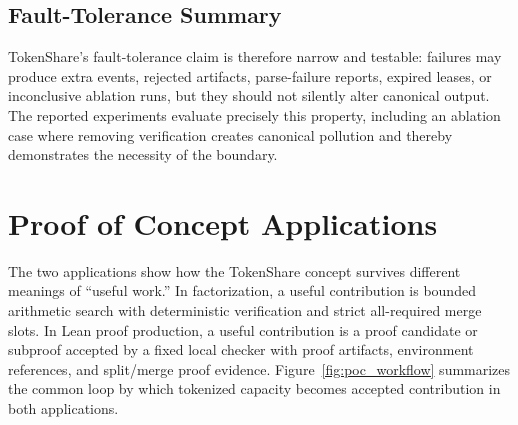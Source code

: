 \documentclass{article}
\theoremstyle{plain}
\begin{document}
\subsection{Fault-Tolerance Summary}

{\color{blue}
TokenShare's fault-tolerance claim is therefore narrow and testable: failures may produce extra events, rejected artifacts, parse-failure reports, expired leases, or inconclusive ablation runs, but they should not silently alter canonical output. The reported experiments evaluate precisely this property, including an ablation case where removing verification creates canonical pollution and thereby demonstrates the necessity of the boundary.
}
\section{Proof of Concept Applications}



{\color{blue}
The two applications show how the TokenShare concept survives different meanings of ``useful work.'' In factorization, a useful contribution is bounded arithmetic search with deterministic verification and strict all-required merge slots. In Lean proof production, a useful contribution is a proof candidate or subproof accepted by a fixed local checker with proof artifacts, environment references, and split/merge proof evidence. Figure~\ref{fig:poc_workflow} summarizes the common loop by which tokenized capacity becomes accepted contribution in both applications.
}
\end{document}
